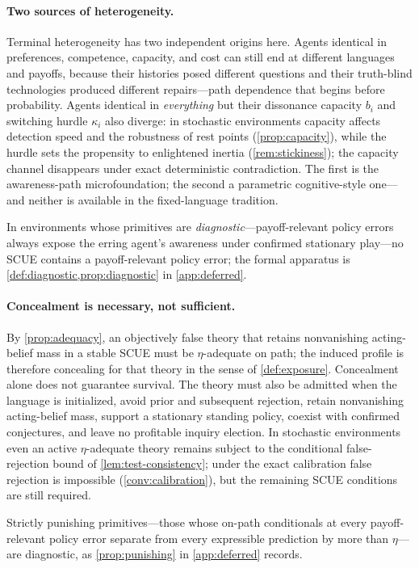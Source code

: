 \documentclass[11pt]{article}
\theoremstyle{definition}
\begin{document}
\paragraph{Two sources of heterogeneity.}
\label{rem:two-sources}
Terminal heterogeneity has two independent origins here.
Agents identical in preferences, competence, capacity, and cost can still end at different languages and payoffs, because their histories posed different questions and their truth-blind technologies produced different repairs---path dependence that begins before probability.
Agents identical in \emph{everything} but their dissonance capacity $b_i$ and switching hurdle $\kappa_i$ also diverge: in stochastic environments capacity affects detection speed and the robustness of rest points (\cref{prop:capacity}), while the hurdle sets the propensity to enlightened inertia (\cref{rem:stickiness}); the capacity channel disappears under exact deterministic contradiction.
The first is the awareness-path microfoundation; the second a parametric cognitive-style one---and neither is available in the fixed-language tradition.

In environments whose primitives are \emph{diagnostic}---payoff-relevant policy errors always expose the erring agent's awareness under confirmed stationary play---no SCUE contains a payoff-relevant policy error; the formal apparatus is \cref{def:diagnostic,prop:diagnostic} in \cref{app:deferred}.

\paragraph{Concealment is necessary, not sufficient.}
By \cref{prop:adequacy}, an objectively false theory that retains nonvanishing acting-belief mass in a stable SCUE must be \(\eta\)-adequate on path; the induced profile is therefore concealing for that theory in the sense of \cref{def:exposure}.
Concealment alone does not guarantee survival.
The theory must also be admitted when the language is initialized, avoid prior and subsequent rejection, retain nonvanishing acting-belief mass, support a stationary standing policy, coexist with confirmed conjectures, and leave no profitable inquiry election.
In stochastic environments even an active \(\eta\)-adequate theory remains subject to the conditional false-rejection bound of \cref{lem:test-consistency}; under the exact calibration false rejection is impossible (\cref{conv:calibration}), but the remaining SCUE conditions are still required.

Strictly punishing primitives---those whose on-path conditionals at every payoff-relevant policy error separate from every expressible prediction by more than $\eta$---are diagnostic, as \cref{prop:punishing} in \cref{app:deferred} records.
\end{document}
